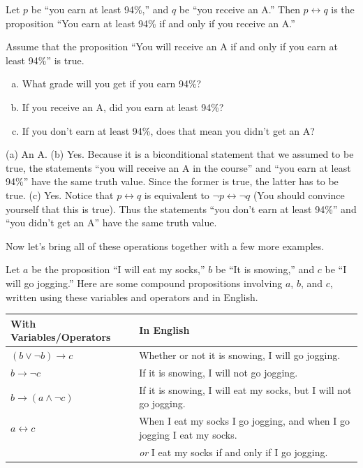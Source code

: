 \begin{exa}
Let $p$ be ``you earn at least 94\%,'' and $q$ be ``you receive an A.''
Then $p\leftrightarrow q$ is the proposition ``You earn at least 94\% if and only if you receive an A.''
\end{exa}

\begin{ques}
Assume that the proposition ``You will receive an A
if and only if you earn at least 94\%'' is true.
\begin{enumerate}[(a)]
\item What grade will you get if you earn 94\%?\\
\answerline
\item If you receive an A, did you earn at least 94\%?\\
\answerline
\item If you don't earn at least 94\%, does that mean you didn't get an A?\\
\answerline
\end{enumerate}
\begin{answer}
(a) An A.
(b) Yes. Because it is a biconditional statement that we assumed to be true, 
the statements ``you will receive an A in the course'' and ``you earn at least 94\%'' have the
same truth value.  Since the former is true, the latter has to be true.
(c) Yes.  Notice that $p\leftrightarrow q$ is equivalent to $\neg p \leftrightarrow \neg q$
(You should convince yourself that this is true).  
Thus the statements ``you don't earn at least 94\%'' and ``you didn't get an A'' have the same
truth value.    
\end{answer}
\end{ques}

Now let's bring all of these operations together with a few more examples.

\begin{exa}
Let $a$ be the proposition ``I will eat my socks,'' $b$ be ``It is snowing,'' and
$c$ be ``I will go jogging.''
Here are some compound propositions involving $a$, $b$, and $c$, written using these
variables and operators and in English.\\
\begin{tabular}{|l|p{}|}
\hline
With Variables/Operators&In English\\
\hline
\hline
$(b \vee \neg b)  \rightarrow c$ &
Whether or not it is snowing, I will go jogging.\\
\hline
$b  \rightarrow \neg c$ & 
If it is snowing, I will not go jogging.\\
\hline
$b  \rightarrow (a \wedge \neg c)$&
If it is snowing, I will eat my socks, but I will not go jogging.\\
\hline
$a \leftrightarrow c$&
When I eat my socks I go jogging, and when I go jogging I eat my socks.\\
&{\em or} I eat my socks if and only if I go jogging.\\
\hline
\end{tabular}
\end{exa}

